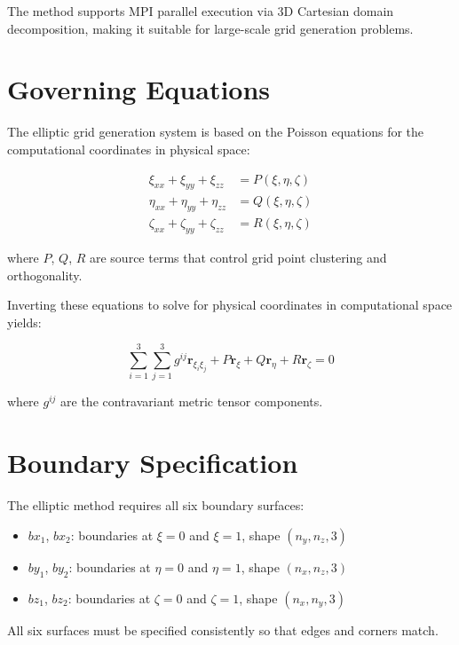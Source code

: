 \documentclass[11pt,a4paper]{report}
\newcommand{\rvec}{\bm{r}}
\begin{document}
The method supports MPI parallel execution via 3D Cartesian domain decomposition, making it suitable for large-scale grid generation problems.

\section{Governing Equations}

The elliptic grid generation system is based on the Poisson equations for the computational coordinates in physical space:

\begin{align}
    \xi_{xx} + \xi_{yy} + \xi_{zz} &= P(\xi, \eta, \zeta) \label{eq:poisson_xi} \\
    \eta_{xx} + \eta_{yy} + \eta_{zz} &= Q(\xi, \eta, \zeta) \label{eq:poisson_eta} \\
    \zeta_{xx} + \zeta_{yy} + \zeta_{zz} &= R(\xi, \eta, \zeta) \label{eq:poisson_zeta}
\end{align}

where $P$, $Q$, $R$ are source terms that control grid point clustering and orthogonality.

Inverting these equations to solve for physical coordinates in computational space yields:

\begin{equation}
    \sum_{i=1}^{3} \sum_{j=1}^{3} g^{ij} \rvec_{\xi_i \xi_j} + P \rvec_\xi + Q \rvec_\eta + R \rvec_\zeta = 0
\end{equation}

where $g^{ij}$ are the contravariant metric tensor components.

\section{Boundary Specification}

The elliptic method requires all six boundary surfaces:

\begin{itemize}
    \item $bx_1$, $bx_2$: boundaries at $\xi = 0$ and $\xi = 1$, shape $(n_y, n_z, 3)$
    \item $by_1$, $by_2$: boundaries at $\eta = 0$ and $\eta = 1$, shape $(n_x, n_z, 3)$
    \item $bz_1$, $bz_2$: boundaries at $\zeta = 0$ and $\zeta = 1$, shape $(n_x, n_y, 3)$
\end{itemize}

All six surfaces must be specified consistently so that edges and corners match.
\end{document}
